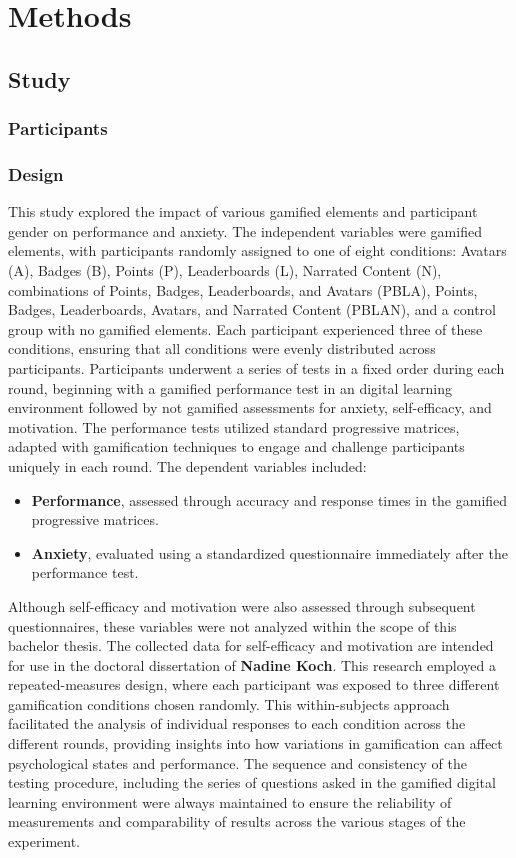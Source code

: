 \section{Methods}
\subsection{Study}
\subsubsection{Participants}
\subsubsection{Design}
This study explored the impact of various gamified elements and participant gender on performance and anxiety.
The independent variables were gamified elements, with participants randomly assigned to one of eight conditions: Avatars (A), Badges (B), Points (P), Leaderboards (L), Narrated Content (N), combinations of Points, Badges, Leaderboards, and Avatars (PBLA), Points, Badges, Leaderboards, Avatars, and Narrated Content (PBLAN), and a control group with no gamified elements.
Each participant experienced three of these conditions, ensuring that all conditions were evenly distributed across participants.
Participants underwent a series of tests in a fixed order during each round, beginning with a gamified performance test in an digital learning environment followed by  not gamified assessments for anxiety, self-efficacy, and motivation.
The performance tests utilized standard progressive matrices, adapted with gamification techniques to engage and challenge participants uniquely in each round.
The dependent variables included:
\begin{itemize}
    \item \textbf{Performance}, assessed through accuracy and response times in the gamified progressive matrices.
    \item \textbf{Anxiety}, evaluated using a standardized questionnaire immediately after the performance test.
\end{itemize}

Although self-efficacy and motivation were also assessed through subsequent questionnaires, these variables were not analyzed within the scope of this bachelor thesis.
The collected data for self-efficacy and motivation are intended for use in the doctoral dissertation of \textbf{Nadine Koch}.
This research employed a repeated-measures design, where each participant was exposed to three different gamification conditions chosen randomly.
This within-subjects approach facilitated the analysis of individual responses to each condition across the different rounds, providing insights into how variations in gamification can affect psychological states and performance.
The sequence and consistency of the testing procedure, including the series of questions asked in the gamified digital learning environment were always maintained to ensure the reliability of measurements and comparability of results across the various stages of the experiment.
